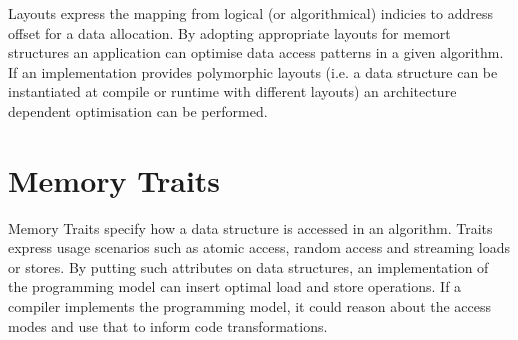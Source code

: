 Layouts express the mapping from logical (or algorithmical) indicies to address offset for a data allocation. 
By adopting appropriate layouts for memort structures an application can optimise data access patterns in a given algorithm.
If an implementation provides polymorphic layouts (i.e. a data structure can be instantiated at compile or runtime with different layouts) an architecture dependent optimisation can be performed.

\section{Memory Traits}

Memory Traits specify how a data structure is accessed in an algorithm. 
Traits express usage scenarios such as atomic access, random access and streaming loads or stores.
By putting such attributes on data structures, an implementation of the programming model can insert optimal load and store operations.
If a compiler implements the programming model, it could reason about the access modes and use that to inform code transformations.   

